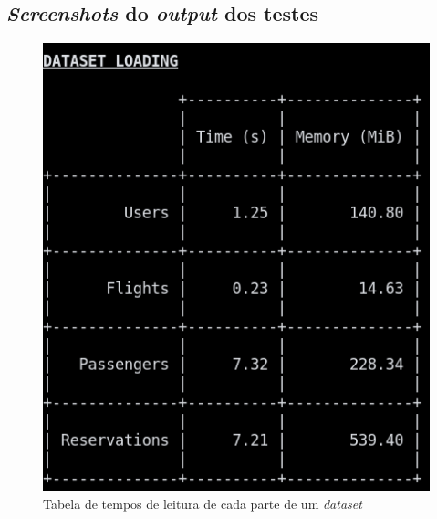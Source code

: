 \documentclass[12pt, a4paper]{article}
\begin{document}
\subsection{\emph{Screenshots} do \emph{output} dos testes}
\label{sec:testing-screenshots}

\begin{figure}[H]
    \centering
    \includegraphics[scale=0.4]{res-fase2/testing_screenshots/dataset.png}
    \caption{Tabela de tempos de leitura de cada parte de um \emph{dataset}}
    \label{fig:dataset-screenshot}
\end{figure}
\end{document}
